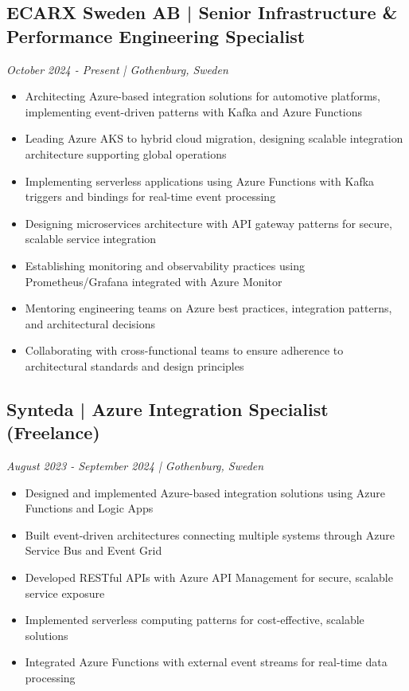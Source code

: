 \documentclass[11pt,a4paper]{article}
\begin{document}
\subsection*{ECARX Sweden AB | Senior Infrastructure \& Performance Engineering Specialist}
\textit{October 2024 - Present | Gothenburg, Sweden}
\begin{itemize}[noitemsep]
\item Architecting Azure-based integration solutions for automotive platforms, implementing event-driven patterns with Kafka and Azure Functions
\item Leading Azure AKS to hybrid cloud migration, designing scalable integration architecture supporting global operations
\item Implementing serverless applications using Azure Functions with Kafka triggers and bindings for real-time event processing
\item Designing microservices architecture with API gateway patterns for secure, scalable service integration
\item Establishing monitoring and observability practices using Prometheus/Grafana integrated with Azure Monitor
\item Mentoring engineering teams on Azure best practices, integration patterns, and architectural decisions
\item Collaborating with cross-functional teams to ensure adherence to architectural standards and design principles
\end{itemize}

\subsection*{Synteda | Azure Integration Specialist (Freelance)}
\textit{August 2023 - September 2024 | Gothenburg, Sweden}
\begin{itemize}[noitemsep]
\item Designed and implemented Azure-based integration solutions using Azure Functions and Logic Apps
\item Built event-driven architectures connecting multiple systems through Azure Service Bus and Event Grid
\item Developed RESTful APIs with Azure API Management for secure, scalable service exposure
\item Implemented serverless computing patterns for cost-effective, scalable solutions
\item Integrated Azure Functions with external event streams for real-time data processing
\end{itemize}
\end{document}
